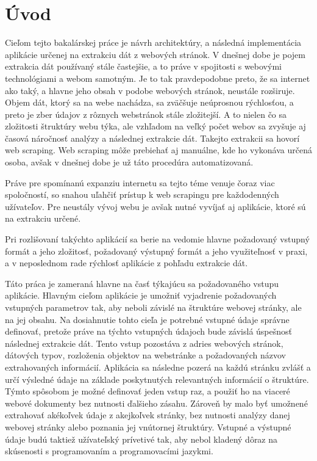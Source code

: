 \chapter{Úvod}

Cieľom tejto bakalárskej práce je návrh architektúry, a následná implementácia aplikácie určenej na extrakciu dát z webových stránok. V dnešnej dobe je pojem extrakcia dát používaný stále častejšie, a to práve v spojitosti s webovými technológiami a webom samotným. Je to tak pravdepodobne preto, že sa internet ako taký, a hlavne jeho obsah v podobe webových stránok, neustále rozširuje. Objem dát, ktorý sa na webe nachádza, sa zväčšuje neúprosnou rýchlosťou, a preto je zber údajov z rôznych webstránok stále zložitejší. A to nielen čo sa zložitosti štruktúry webu týka, ale vzhľadom na veľký počet webov sa zvyšuje aj časová náročnosť analýzy a následnej extrakcie dát. Takejto extrakcii sa hovorí web scraping. Web scraping môže prebiehať aj manuálne, kde ho vykonáva určená osoba, avšak v dnešnej dobe je už táto procedúra automatizovaná.

Práve pre spomínanú expanziu internetu sa tejto téme venuje čoraz viac spoločností, so snahou uľahčiť prístup k web scrapingu pre každodenných užívateľov. Pre neustály vývoj webu je avšak nutné vyvíjať aj aplikácie, ktoré sú na extrakciu určené. 

Pri rozlišovaní takýchto aplikácií sa berie na vedomie hlavne požadovaný vstupný formát a jeho zložitosť, požadovaný výstupný formát a jeho využiteľnosť v praxi, a v neposlednom rade rýchlosť aplikácie z pohľadu extrakcie dát. 

Táto práca je zameraná hlavne na časť týkajúcu sa požadovaného vstupu aplikácie. Hlavným cieľom aplikácie je umožniť vyjadrenie požadovaných vstupných parametrov tak, aby neboli závislé na štruktúre webovej stránky, ale na jej obsahu. Na dosiahnutie tohto cieľa je potrebné vstupné údaje správne definovať, pretože práve na týchto vstupných údajoch bude závislá úspešnosť následnej extrakcie dát. Tento vstup pozostáva z adries webových stránok, dátových typov, rozloženia objektov na webstránke a požadovaných názvov extrahovaných informácií. Aplikácia sa následne pozerá na každú stránku zvlášť a určí výsledné údaje na základe poskytnutých relevantných informácií o štruktúre. Týmto spôsobom je možné definovať jeden vstup raz, a použiť ho na viaceré webové dokumenty bez nutnosti ďalšieho zásahu. Zároveň by malo byť umožnené extrahovať akékoľvek údaje z akejkoľvek stránky, bez nutnosti analýzy danej webovej stránky alebo poznania jej vnútornej štruktúry. Vstupné a výstupné údaje budú taktiež užívateľský prívetivé tak, aby nebol kladený dôraz na skúsenosti s programovaním a programovacími jazykmi.

